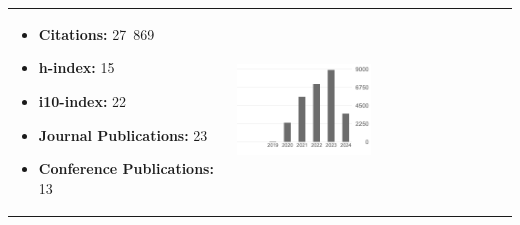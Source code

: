 \documentclass[10pt,A4]{article} %
\begin{document}
\hspace{-10pt}
\begin{tabular}{ll}
\begin{minipage}{0.6\textwidth}
\begin{itemize}
\item \textbf{Citations:} 27\, 869
 \item \textbf{h-index:} 15
 \item \textbf{i10-index:} 22
 \item \textbf{Journal Publications:} 23
\item \textbf{Conference Publications:} 13
\end{itemize}\end{minipage}
    &
\begin{minipage}{0.4\textwidth}
\includegraphics[width=0.5\textwidth]{citation-graph}
\end{minipage}
\end{tabular}



\begin{flushright}
\end{flushright}
\end{document}
